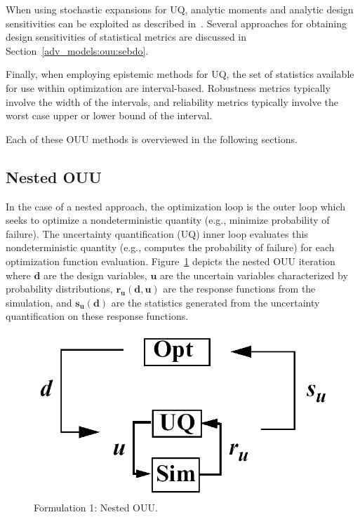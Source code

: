 When using stochastic expansions for UQ, analytic moments and
analytic design sensitivities can be exploited as described
in~\cite{Eld07}. Several approaches for obtaining design
sensitivities of statistical metrics are discussed in 
Section~\ref{adv_models:ouu:sebdo}.

Finally, when employing epistemic methods for UQ, the set of
statistics available for use within optimization are interval-based.
Robustness metrics typically involve the width of the intervals, and
reliability metrics typically involve the worst case upper or lower
bound of the interval.

Each of these OUU methods is overviewed in the following sections.

\subsection{Nested OUU}\label{adv_models:ouu:nested}

In the case of a nested approach, the optimization loop is the outer
loop which seeks to optimize a nondeterministic quantity (e.g.,
minimize probability of failure). The uncertainty quantification (UQ)
inner loop evaluates this nondeterministic quantity (e.g., computes
the probability of failure) for each optimization function evaluation.
Figure~\ref{adv_models:figure08} depicts the nested OUU iteration where
$\mathit{\mathbf{d}}$ are the design variables, $\mathit{\mathbf{u}}$
are the uncertain variables characterized by probability
distributions, $\mathit{\mathbf{r_{u}(d,u)}}$ are the response
functions from the simulation, and $\mathit{\mathbf{s_{u}(d)}}$ are
the statistics generated from the uncertainty quantification on these
response functions.

\begin{figure}
  \centering
  \includegraphics[scale=0.33]{images/nested_ouu}
  \caption{Formulation 1: Nested OUU.}
  \label{adv_models:figure08}
\end{figure}

